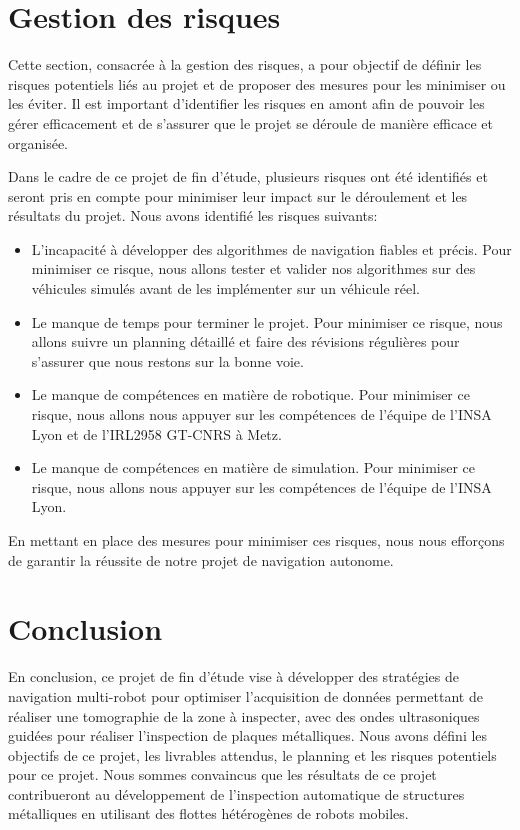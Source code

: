 \documentclass[init,francais,RandD]{rapportPFE}
\begin{document}
	\section{Gestion des risques}
		Cette section, consacrée à la gestion des risques, a pour objectif de définir les risques potentiels liés au projet et de proposer des mesures pour les minimiser ou les éviter. Il est important d'identifier les risques en amont afin de pouvoir les gérer efficacement et de s'assurer que le projet se déroule de manière efficace et organisée.

		Dans le cadre de ce projet de fin d'étude, plusieurs risques ont été identifiés et seront pris en compte pour minimiser leur impact sur le déroulement et les résultats du projet. Nous avons identifié les risques suivants:
		\begin{itemize}
			\item L'incapacité à développer des algorithmes de navigation fiables et précis. Pour minimiser ce risque, nous allons tester et valider nos algorithmes sur des véhicules simulés avant de les implémenter sur un véhicule réel.
			\item Le manque de temps pour terminer le projet. Pour minimiser ce risque, nous allons suivre un planning détaillé et faire des révisions régulières pour s'assurer que nous restons sur la bonne voie.
			\item Le manque de compétences en matière de robotique. Pour minimiser ce risque, nous allons nous appuyer sur les compétences de l'équipe de l'INSA Lyon et de l'IRL2958 GT-CNRS à Metz.
			\item Le manque de compétences en matière de simulation. Pour minimiser ce risque, nous allons nous appuyer sur les compétences de l'équipe de l'INSA Lyon.
		\end{itemize}
		En mettant en place des mesures pour minimiser ces risques, nous nous efforçons de garantir la réussite de notre projet de navigation autonome.
	\section{Conclusion}
		En conclusion, ce projet de fin d'étude vise à développer des stratégies de navigation multi-robot pour optimiser l'acquisition de données permettant de réaliser une tomographie de la zone à inspecter, avec des ondes ultrasoniques guidées pour réaliser l'inspection de plaques métalliques. Nous avons défini les objectifs de ce projet, les livrables attendus, le planning et les risques potentiels pour ce projet. Nous sommes convaincus que les résultats de ce projet contribueront au développement de l'inspection automatique de structures métalliques en utilisant des flottes hétérogènes de robots mobiles.
\end{document}
